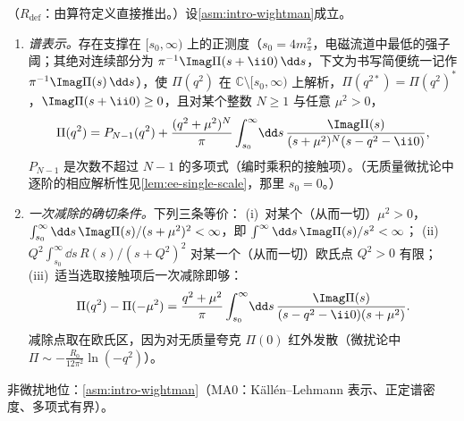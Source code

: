 \begin{proposition}\label{prop:ee-analytic}
（$R_{\mathrm{def}}$：由算符定义直接推出。）设\cref{asm:intro-wightman}成立。
\begin{enumerate}[label=(\alph*),leftmargin=2em,itemsep=1pt,topsep=2pt]
\item \emph{谱表示。}存在支撑在 $[s_0,\infty)$ 上的正测度（$s_0=4m_\pi^2$，电磁流道中最低的强子阈；其绝对连续部分为 $\pi^{-1}\Imag\Pi(s+\ii0)\,\dd s$，下文为书写简便统一记作 $\pi^{-1}\Imag\Pi(s)\,\dd s$），使 $\Pi(q^2)$ 在 $\mathbb C\setminus[s_0,\infty)$ 上解析，$\Pi(q^{2*})=\Pi(q^2)^*$，$\Imag\Pi(s+\ii0)\ge0$，且对某个整数 $N\ge1$ 与任意 $\mu^2>0$，
\begin{equation}\label{eq:ee-KL}
\Pi(q^2)=P_{N-1}(q^2)+\frac{(q^2+\mu^2)^N}{\pi}\int_{s_0}^\infty\!\dd s\,\frac{\Imag\Pi(s)}{(s+\mu^2)^N(s-q^2-\ii0)} ,
\end{equation}
$P_{N-1}$ 是次数不超过 $N-1$ 的多项式（编时乘积的接触项）。（无质量微扰论中逐阶的相应解析性见\cref{lem:ee-single-scale}，那里 $s_0=0$。）
\item \emph{一次减除的确切条件。}下列三条等价：
(i)~对某个（从而一切）$\mu^2>0$，$\int_{s_0}^\infty\dd s\,\Imag\Pi(s)/(s+\mu^2)^2<\infty$，即 $\int^\infty\dd s\,\Imag\Pi(s)/s^2<\infty$；
(ii)~$Q^2\int_{s_0}^\infty\dd s\,R(s)/(s+Q^2)^2$ 对某一个（从而一切）欧氏点 $Q^2>0$ 有限；
(iii)~适当选取接触项后一次减除即够：
\begin{equation}\label{eq:ee-once}
\Pi(q^2)-\Pi(-\mu^2)=\frac{q^2+\mu^2}{\pi}\int_{s_0}^\infty\!\dd s\,\frac{\Imag\Pi(s)}{(s-q^2-\ii0)(s+\mu^2)} .
\end{equation}
减除点取在欧氏区，因为对无质量夸克 $\Pi(0)$ 红外发散（微扰论中 $\Pi\sim-\frac{R_0}{12\pi^2}\ln(-q^2)$）。
\end{enumerate}
非微扰地位：\cref{asm:intro-wightman}（MA0：Källén--Lehmann 表示、正定谱密度、多项式有界）。
\end{proposition}
